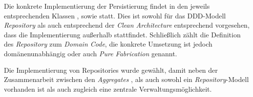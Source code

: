 Die konkrete Implementierung der Persistierung findet in den jeweils entsprechenden Klassen \href{}{}, \href{}{} sowie \href{}{} statt.
Dies ist sowohl für das \ac{DDD}-Modell \textit{Repository} als auch entsprechend der \textit{Clean Architecture} entsprechend vorgesehen, dass die Implementierung außerhalb stattfindet. 
Schließlich zählt die Definition des \textit{Repository} zum \textit{Domain Code}, die konkrete Umsetzung ist jedoch domänenunabhängig oder auch \textit{Pure Fabrication} genannt.

Die Implementierung von Repositories wurde gewählt, damit neben der Zusammenarbeit zwischen den \textit{Aggregates} \href{}{}, \href{}{} als auch \href{}{} sowohl ein \textit{Repository}-Modell vorhanden ist als auch zugleich eine zentrale Verwaltungsmöglichkeit.
